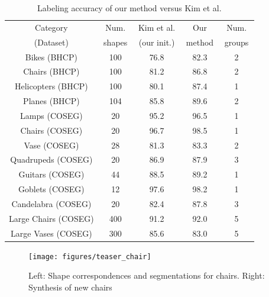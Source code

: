 \vskip -2mm
\begin{table}[h]
\centering
\begin{tabular}{|@{}c@{}|@{}c@{}|@{}c@{}|@{}c@{}|@{}c@{}|}
\hline
 Category           & Num.            & \,Kim et al.\, & Our          & Num. \\
 (Dataset)          & \,shapes\,      & \,(our init.)\,  & \,method\, & \,groups\, \\  
\hline  
 Bikes (BHCP)        & 100   & 76.8 & 82.3 & 2 \\
 Chairs (BHCP)       & 100   & 81.2 & 86.8 & 2\\
 Helicopters (BHCP)  & 100   & 80.1 & 87.4 & 1 \\
 Planes (BHCP)       & 104   & 85.8 & 89.6 & 2 \\
\hline  
 Lamps (COSEG)      & 20    & 95.2 & 96.5 & 1 \\
 Chairs (COSEG)     & 20    & 96.7 & 98.5& 1 \\
 Vase (COSEG)       & 28    & 81.3 & 83.3& 2 \\
 Quadrupeds (COSEG) & 20    & 86.9 & 87.9& 3 \\
 Guitars (COSEG)    & 44    & 88.5 & 89.2 & 1 \\
 Goblets (COSEG)    & 12    & 97.6 & 98.2 & 1\\
 Candelabra (COSEG) & 20    & 82.4 & 87.8 & 3\\
 Large Chairs (COSEG) & 400 & 91.2 & 92.0 & 5 \\
 Large Vases (COSEG)  & 300 & 85.6 & 83.0 & 5 \\
\hline 
\end{tabular}
\vskip -1mm
\caption{Labeling accuracy of our method versus Kim et al.}
\label{table:results_coseg}
\vskip -2mm
\end{table}

\begin{figure}[t]
\centering
\texttt{[image: figures/teaser\_chair]}
\vskip -2mm
\caption{Left: Shape correspondences and segmentations for chairs. Right: Synthesis of new chairs}
\label{fig:chairs_synthesis}
\vskip -8mm
\end{figure}

